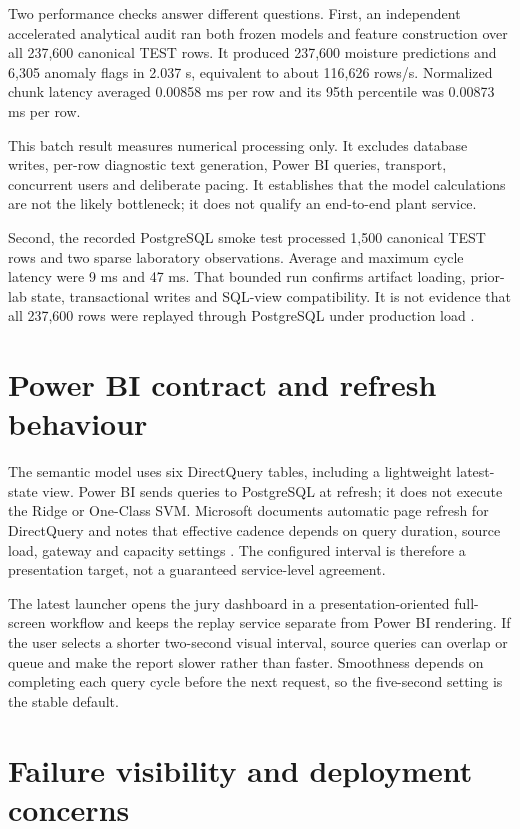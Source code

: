 Two performance checks answer different questions. First, an independent accelerated analytical audit ran both frozen models and feature construction over all 237,600 canonical TEST rows. It produced 237,600 moisture predictions and 6,305 anomaly flags in 2.037 s, equivalent to about 116,626 rows/s. Normalized chunk latency averaged 0.00858 ms per row and its 95th percentile was 0.00873 ms per row.

This batch result measures numerical processing only. It excludes database writes, per-row diagnostic text generation, Power BI queries, transport, concurrent users and deliberate pacing. It establishes that the model calculations are not the likely bottleneck; it does not qualify an end-to-end plant service.

Second, the recorded PostgreSQL smoke test processed 1,500 canonical TEST rows and two sparse laboratory observations. Average and maximum cycle latency were 9 ms and 47 ms. That bounded run confirms artifact loading, prior-lab state, transactional writes and SQL-view compatibility. It is not evidence that all 237,600 rows were replayed through PostgreSQL under production load \cite{runtimelog}.

\section{Power BI contract and refresh behaviour}

The semantic model uses six DirectQuery tables, including a lightweight latest-state view. Power BI sends queries to PostgreSQL at refresh; it does not execute the Ridge or One-Class SVM. Microsoft documents automatic page refresh for DirectQuery and notes that effective cadence depends on query duration, source load, gateway and capacity settings \cite{powerbiautorefresh}. The configured interval is therefore a presentation target, not a guaranteed service-level agreement.

The latest launcher opens the jury dashboard in a presentation-oriented full-screen workflow and keeps the replay service separate from Power BI rendering. If the user selects a shorter two-second visual interval, source queries can overlap or queue and make the report slower rather than faster. Smoothness depends on completing each query cycle before the next request, so the five-second setting is the stable default.

\section{Failure visibility and deployment concerns}

